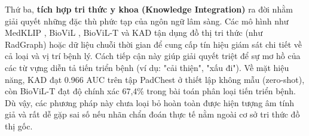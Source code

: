 Thứ ba, \textbf{tích hợp tri thức y khoa (Knowledge Integration)} ra đời nhằm giải quyết những đặc thù phức tạp của ngôn ngữ lâm sàng. Các mô hình như MedKLIP \cite{MedKLIP}, BioViL \cite{BioViL}, BioViL-T \cite{BioViL-T} và KAD \cite{KAD} tận dụng đồ thị tri thức (như RadGraph) hoặc dữ liệu chuỗi thời gian để cung cấp tín hiệu giám sát chi tiết về cả loại và vị trí bệnh lý. Cách tiếp cận này giúp giải quyết triệt để sự mơ hồ của các từ vựng diễn tả tiến triển bệnh (ví dụ: "cải thiện", "xấu đi"). Về mặt hiệu năng, KAD \cite{KAD} đạt 0.966 AUC trên tập PadChest ở thiết lập không mẫu (zero-shot), còn BioViL-T \cite{BioViL-T} đạt độ chính xác 67,4\% trong bài toán phân loại tiến triển bệnh. Dù vậy, các phương pháp này chưa loại bỏ hoàn toàn được hiện tượng âm tính giả và rất dễ gặp sai số nếu nhãn chẩn đoán thực tế nằm ngoài cơ sở tri thức đồ thị gốc.

